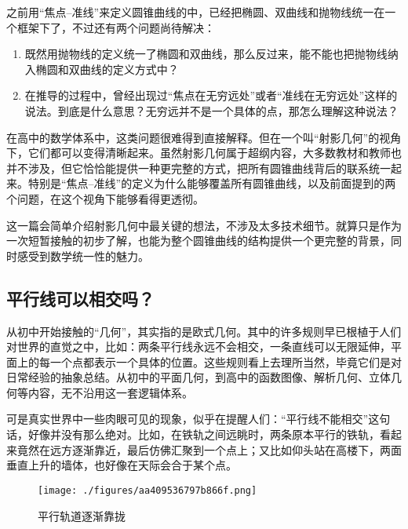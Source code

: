 
\begin{issues}
\issueDraft
\end{issues}


之前用“焦点–准线”来定义圆锥曲线的中，已经把椭圆、双曲线和抛物线统一在一个框架下了，不过还有两个问题尚待解决：
\begin{enumerate}
\item 既然用抛物线的定义统一了椭圆和双曲线，那么反过来，能不能也把抛物线纳入椭圆和双曲线的定义方式中？
\item 在推导的过程中，曾经出现过“焦点在无穷远处”或者“准线在无穷远处”这样的说法。到底是什么意思？无穷远并不是一个具体的点，那怎么理解这种说法？
\end{enumerate}

在高中的数学体系中，这类问题很难得到直接解释。但在一个叫“射影几何”的视角下，它们都可以变得清晰起来。虽然射影几何属于超纲内容，大多数教材和教师也并不涉及，但它恰恰能提供一种更完整的方式，把所有圆锥曲线背后的联系统一起来。特别是“焦点–准线”的定义为什么能够覆盖所有圆锥曲线，以及前面提到的两个问题，在这个视角下能够看得更透彻。

这一篇会简单介绍射影几何中最关键的想法，不涉及太多技术细节。就算只是作为一次短暂接触的初步了解，也能为整个圆锥曲线的结构提供一个更完整的背景，同时感受到数学统一性的魅力。

\subsection{平行线可以相交吗？}

从初中开始接触的“几何”，其实指的是欧式几何。其中的许多规则早已根植于人们对世界的直觉之中，比如：两条平行线永远不会相交，一条直线可以无限延伸，平面上的每一个点都表示一个具体的位置。这些规则看上去理所当然，毕竟它们是对日常经验的抽象总结。从初中的平面几何，到高中的函数图像、解析几何、立体几何等内容，无不沿用这一套逻辑体系。

可是真实世界中一些肉眼可见的现象，似乎在提醒人们：“平行线不能相交”这句话，好像并没有那么绝对。比如，在铁轨之间远眺时，两条原本平行的铁轨，看起来竟然在远方逐渐靠近，最后仿佛汇聚到一个点上；又比如仰头站在高楼下，两面垂直上升的墙体，也好像在天际会合于某个点。

\begin{figure}[ht]
\centering
\texttt{[image: ./figures/aa409536797b866f.png]}
\caption{平行轨道逐渐靠拢} \label{fig_HsCsFD_2}
\end{figure}

